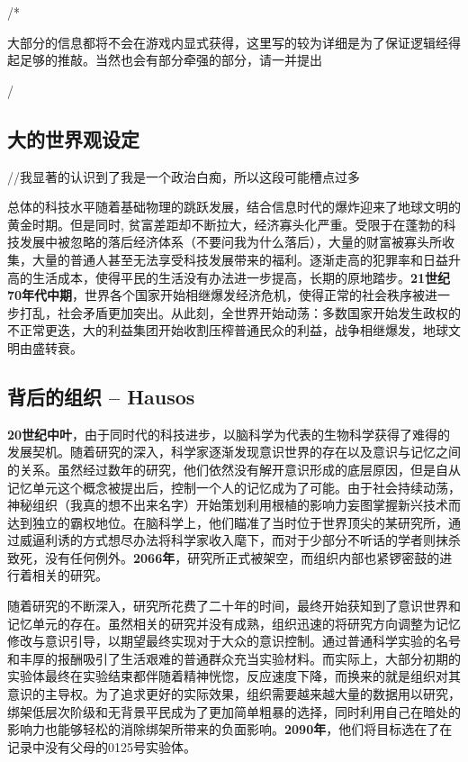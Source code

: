 \documentclass[12pt, a4paper]{article}
\begin{document}
    \noindent /*

    大部分的信息都将不会在游戏内显式获得，这里写的较为详细是为了保证逻辑经得起足够的推敲。当然也会有部分牵强的部分，请一并提出

    \noindent */

    \subsection*{大的世界观设定}    

    //我显著的认识到了我是一个政治白痴，所以这段可能槽点过多
    
    总体的科技水平随着基础物理的跳跃发展，结合信息时代的爆炸迎来了地球文明的黄金时期。但是同时, 贫富差距却不断拉大，经济寡头化严重。受限于在蓬勃的科技发展中被忽略的落后经济体系（不要问我为什么落后），大量的财富被寡头所收集，大量的普通人甚至无法享受科技发展带来的福利。逐渐走高的犯罪率和日益升高的生活成本，使得平民的生活没有办法进一步提高，长期的原地踏步。\textbf{21世纪70年代中期}，世界各个国家开始相继爆发经济危机，使得正常的社会秩序被进一步打乱，社会矛盾更加突出。从此刻，全世界开始动荡：多数国家开始发生政权的不正常更迭，大的利益集团开始收割压榨普通民众的利益，战争相继爆发，地球文明由盛转衰。


    \subsection*{背后的组织 -- Hausos}

    \textbf{20世纪中叶}，由于同时代的科技进步，以脑科学为代表的生物科学获得了难得的发展契机。随着研究的深入，科学家逐渐发现意识世界的存在以及意识与记忆之间的关系。虽然经过数年的研究，他们依然没有解开意识形成的底层原因，但是自从记忆单元这个概念被提出后，控制一个人的记忆成为了可能。由于社会持续动荡，神秘组织（我真的想不出来名字）开始策划利用根植的影响力妄图掌握新兴技术而达到独立的霸权地位。在脑科学上，他们瞄准了当时位于世界顶尖的某研究所，通过威逼利诱的方式想尽办法将科学家收入麾下，而对于少部分不听话的学者则抹杀致死，没有任何例外。\textbf{2066年}，研究所正式被架空，而组织内部也紧锣密鼓的进行着相关的研究。

    随着研究的不断深入，研究所花费了二十年的时间，最终开始获知到了意识世界和记忆单元的存在。虽然相关的研究并没有成熟，组织迅速的将研究方向调整为记忆修改与意识引导，以期望最终实现对于大众的意识控制。通过普通科学实验的名号和丰厚的报酬吸引了生活艰难的普通群众充当实验材料。而实际上，大部分初期的实验体最终在实验结束都伴随着精神恍惚，反应速度下降，而换来的就是组织对其意识的主导权。为了追求更好的实际效果，组织需要越来越大量的数据用以研究，绑架低层次阶级和无背景平民成为了更加简单粗暴的选择，同时利用自己在暗处的影响力也能够轻松的消除绑架所带来的负面影响。\textbf{2090年}，他们将目标选在了在记录中没有父母的0125号实验体。
\end{document}

